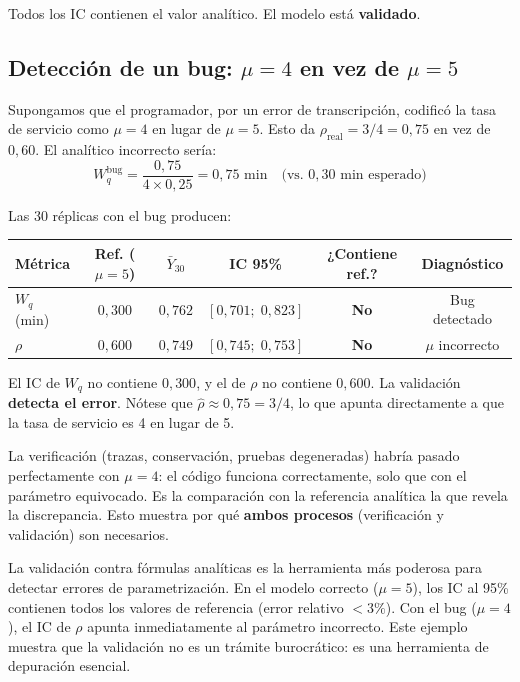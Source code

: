\documentclass[11pt, letterpaper]{article}
\begin{document}
Todos los IC contienen el valor analítico. El modelo está \textbf{validado}.

\subsection{Detección de un bug: $\mu=4$ en vez de $\mu=5$}

Supongamos que el programador, por un error de transcripción, codificó la tasa de servicio como $\mu=4$ en lugar de $\mu=5$. Esto da $\rho_{\text{real}} = 3/4 = 0{,}75$ en vez de $0{,}60$. El analítico incorrecto sería:
\[
W_q^{\text{bug}} = \frac{0{,}75}{4 \times 0{,}25} = 0{,}75 \text{ min} \quad \text{(vs.\ } 0{,}30 \text{ min esperado)}
\]

Las 30 réplicas con el bug producen:

\begin{center}\small
\renewcommand{\arraystretch}{1.3}
\begin{tabular}{lccccc}
\toprule
\textbf{Métrica} & \textbf{Ref. ($\mu=5$)} & $\bar Y_{30}$ & \textbf{IC 95\%} & \textbf{¿Contiene ref.?} & \textbf{Diagnóstico} \\
\midrule
$W_q$ (min) & $0{,}300$ & $0{,}762$ & $[0{,}701;\; 0{,}823]$ & \textbf{No} & Bug detectado \\
$\rho$       & $0{,}600$ & $0{,}749$ & $[0{,}745;\; 0{,}753]$ & \textbf{No} & $\mu$ incorrecto \\
\bottomrule
\end{tabular}
\end{center}

El IC de $W_q$ no contiene $0{,}300$, y el de $\rho$ no contiene $0{,}600$. La validación \textbf{detecta el error}. Nótese que $\hat\rho \approx 0{,}75 = 3/4$, lo que apunta directamente a que la tasa de servicio es 4 en lugar de 5.

\begin{alertabox}
La verificación (trazas, conservación, pruebas degeneradas) habría pasado perfectamente con $\mu=4$: el código funciona correctamente, solo que con el parámetro equivocado. Es la comparación con la referencia analítica la que revela la discrepancia. Esto muestra por qué \textbf{ambos procesos} (verificación y validación) son necesarios.
\end{alertabox}

\begin{resultadobox}
La validación contra fórmulas analíticas es la herramienta más poderosa para detectar errores de parametrización. En el modelo correcto ($\mu=5$), los IC al 95\% contienen todos los valores de referencia (error relativo $< 3\%$). Con el bug ($\mu=4$), el IC de $\rho$ apunta inmediatamente al parámetro incorrecto. Este ejemplo muestra que la validación no es un trámite burocrático: es una herramienta de depuración esencial.
\end{resultadobox}
\end{document}
